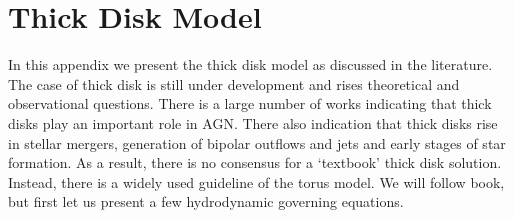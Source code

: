 \documentclass[modern]{aastex62}
\begin{document}

\section{Thick Disk Model\label{app:thick_disk_model}}
In this appendix we present the thick disk model as discussed in the literature. The case of thick disk is still under development and rises theoretical and observational questions. There is a large number of works indicating that thick disks play an important role in AGN. There also indication that thick disks rise in stellar mergers, generation of bipolar outflows and jets and early stages of star formation.
As a result, there is no consensus for a `textbook' thick disk solution. Instead, there is a widely used guideline of the torus model.
We will follow \cite{2002apa..book.....F} book, but first let us present a few hydrodynamic governing equations.
\end{document}
